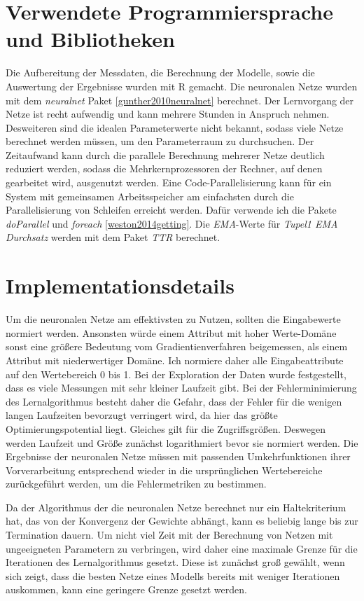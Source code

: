 \documentclass[
	12pt,
	a4paper,
	BCOR10mm,
	DIV14,
	listof=totoc,
	bibliography=totoc,
	headsepline
]{scrreprt}
\begin{document}
\section{Verwendete Programmiersprache und Bibliotheken}
Die Aufbereitung der Messdaten, die Berechnung der Modelle, sowie die Auswertung der Ergebnisse wurden mit R gemacht.
Die neuronalen Netze wurden mit dem \textit{neuralnet} Paket \ref{gunther2010neuralnet} berechnet. Der Lernvorgang der Netze ist recht aufwendig und kann mehrere Stunden in Anspruch nehmen.
Desweiteren sind die idealen Parameterwerte nicht bekannt, sodass viele Netze berechnet werden müssen, um den Parameterraum zu durchsuchen.
Der Zeitaufwand kann durch die parallele Berechnung mehrerer Netze deutlich reduziert werden, sodass die Mehrkernprozessoren der Rechner, auf denen gearbeitet wird, ausgenutzt werden.
Eine Code-Parallelisierung kann für ein System mit gemeinsamen Arbeitsspeicher am einfachsten durch die Parallelisierung von Schleifen erreicht werden. Dafür verwende ich die Pakete \textit{doParallel} und \textit{foreach} \ref{weston2014getting}.
Die \textit{EMA}-Werte für \textit{Tupel1 EMA Durchsatz} werden mit dem Paket \textit{TTR} berechnet.

\section{Implementationsdetails}
Um die neuronalen Netze am effektivsten zu Nutzen, sollten die Eingabewerte normiert werden. Ansonsten würde einem Attribut mit hoher Werte-Domäne sonst eine größere Bedeutung vom Gradientienverfahren beigemessen, als einem Attribut mit niederwertiger Domäne. 
Ich normiere daher alle Eingabeattribute auf den Wertebereich 0 bis 1. 
Bei der Exploration der Daten wurde festgestellt, dass es viele Messungen mit sehr kleiner Laufzeit gibt.
Bei der Fehlerminimierung des Lernalgorithmus besteht daher die Gefahr, dass der Fehler für die wenigen langen Laufzeiten bevorzugt verringert wird, da hier das größte Optimierungspotential liegt. Gleiches gilt für die Zugriffsgrößen.
Deswegen werden Laufzeit und Größe zunächst logarithmiert bevor sie normiert werden.
Die Ergebnisse der neuronalen Netze müssen mit passenden Umkehrfunktionen ihrer Vorverarbeitung entsprechend wieder in die ursprünglichen Wertebereiche zurückgeführt werden, um die Fehlermetriken zu bestimmen.

Da der Algorithmus der die neuronalen Netze berechnet nur ein Haltekriterium hat, das von der Konvergenz der Gewichte abhängt, kann es beliebig lange bis zur Termination dauern.
Um nicht viel Zeit mit der Berechnung von Netzen mit ungeeigneten Parametern zu verbringen, wird daher eine maximale Grenze für die Iterationen des Lernalgorithmus gesetzt. Diese ist zunächst groß gewählt, wenn sich zeigt, dass die besten Netze eines Modells bereits mit weniger Iterationen auskommen, kann eine geringere Grenze gesetzt werden.
\end{document}
